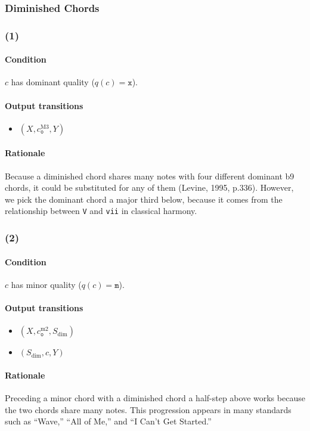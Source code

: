 \documentclass[]{article}
\begin{document}
\subsubsection{Diminished Chords}
\label{sec:diminished_chords}
\subsubsection*{(1)}
\paragraph{Condition} $c$ has dominant quality ($q(c) = \texttt{x}$).

\paragraph{Output transitions}
\begin{itemize}
	\item $(X, c_\texttt{o}^\textrm{M3}, Y)$
\end{itemize}

\paragraph{Rationale} Because a diminished chord shares many notes with four different dominant b9 chords, it could be substituted for any of them (Levine, 1995, p.336).  However, we pick the dominant chord a major third below, because it comes from the relationship between \texttt{V} and \texttt{vii} in classical harmony.

\subsubsection*{(2)}
\paragraph{Condition} $c$ has minor quality ($q(c) = \texttt{m}$).

\paragraph{Output transitions}
\begin{itemize}
	\item $(X, c_\texttt{o}^\textrm{m2}, S_\textrm{dim})$
	\item $(S_\textrm{dim}, c, Y)$
\end{itemize}

\paragraph{Rationale} Preceding a minor chord with a diminished chord a half-step above works because the two chords share many notes.  This progression appears in many standards such as ``Wave,'' ``All of Me,'' and ``I Can't Get Started.''
\end{document}
